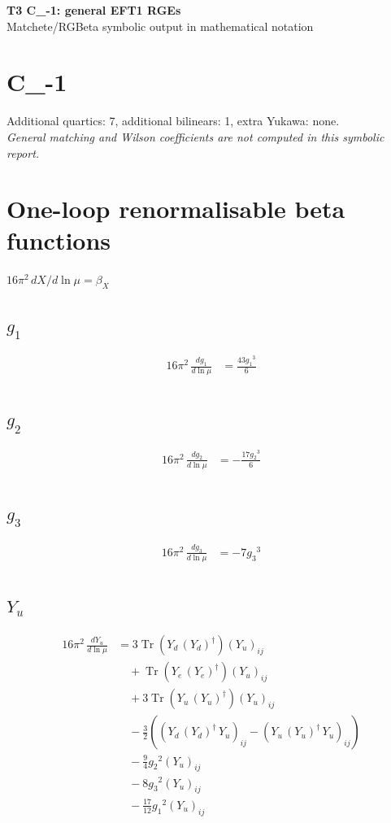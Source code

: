 \documentclass[10pt,a4paper]{article}
\begin{document}
\begin{center}
{\Large\bfseries T3 C\_-1: general EFT1 RGEs}\\[4pt]
Matchete/RGBeta symbolic output in mathematical notation
\end{center}
\bigskip
\section*{C\_-1}
Additional quartics: 7, additional bilinears: 1, extra Yukawa: none.\\
\emph{General matching and Wilson coefficients are not computed in this symbolic report.}
\clearpage
\section*{One-loop renormalisable beta functions}
$16\pi^2\,dX/d\ln\mu=\beta_X$
\subsection*{$g_1$}
\begin{align*}
16\pi^2\,\frac{d g_1}{d\ln\mu} &=\frac{43 {g_1}^3}{6} \\
\end{align*}
\subsection*{$g_2$}
\begin{align*}
16\pi^2\,\frac{d g_2}{d\ln\mu} &=-\frac{17 {g_2}^3}{6} \\
\end{align*}
\subsection*{$g_3$}
\begin{align*}
16\pi^2\,\frac{d g_3}{d\ln\mu} &=-7 {g_3}^3 \\
\end{align*}
\subsection*{$Y_u$}
\begin{align*}
16\pi^2\,\frac{d Y_u}{d\ln\mu} &=3 \operatorname{Tr}\!\left({Y_d}\,\left({Y_d}\right)^{\dagger}\right) \left({Y_u}\right)_{ij} \\
&\quad +\operatorname{Tr}\!\left({Y_e}\,\left({Y_e}\right)^{\dagger}\right) \left({Y_u}\right)_{ij} \\
&\quad +3 \operatorname{Tr}\!\left({Y_u}\,\left({Y_u}\right)^{\dagger}\right) \left({Y_u}\right)_{ij} \\
&\quad -\frac{3}{2} (\left({Y_d}\,\left({Y_d}\right)^{\dagger}\,{Y_u}\right)_{ij}-\left({Y_u}\,\left({Y_u}\right)^{\dagger}\,{Y_u}\right)_{ij}) \\
&\quad -\frac{9}{4} {g_2}^2 \left({Y_u}\right)_{ij} \\
&\quad -8 {g_3}^2 \left({Y_u}\right)_{ij} \\
&\quad -\frac{17}{12} {g_1}^2 \left({Y_u}\right)_{ij} \\
\end{align*}
\end{document}
